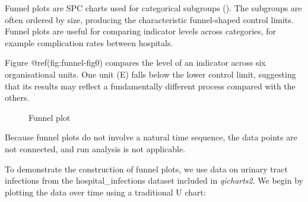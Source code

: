 \documentclass[
]{book}
\makeatletter
\newenvironment{Shaded}{\begin{snugshade}}{\end{snugshade}}
\newcommand{\AttributeTok}[1]{\textcolor[rgb]{0.13,0.29,0.53}{#1}}
\newcommand{\CommentTok}[1]{\textcolor[rgb]{0.56,0.35,0.01}{\textit{#1}}}
\newcommand{\DecValTok}[1]{\textcolor[rgb]{0.00,0.00,0.81}{#1}}
\newcommand{\FunctionTok}[1]{\textcolor[rgb]{0.13,0.29,0.53}{\textbf{#1}}}
\newcommand{\NormalTok}[1]{#1}
\newcommand{\OtherTok}[1]{\textcolor[rgb]{0.56,0.35,0.01}{#1}}
\newcommand{\SpecialCharTok}[1]{\textcolor[rgb]{0.81,0.36,0.00}{\textbf{#1}}}
\newcommand{\StringTok}[1]{\textcolor[rgb]{0.31,0.60,0.02}{#1}}
\newcommand*\pandocbounded[1]{%
  \sbox\pandoc@box{#1}%
  \Gscale@div\@tempa{\textheight}{\dimexpr\ht\pandoc@box+\dp\pandoc@box\relax}%
  \Gscale@div\@tempb{\linewidth}{\wd\pandoc@box}%
  \ifdim\@tempb\p@<\@tempa\p@\let\@tempa\@tempb\fi%
  \ifdim\@tempa\p@<\p@\scalebox{\@tempa}{\usebox\pandoc@box}%
  \else\usebox{\pandoc@box}%
  \fi%
}
\makeatother
\begin{document}
Funnel plots are SPC charts used for categorical subgroups
(). The subgroups
are often ordered by size, producing the characteristic funnel-shaped
control limits. Funnel plots are useful for comparing indicator levels
across categories, for example complication rates between hospitals.

Figure @ref(fig:funnel-fig0) compares the level of an indicator across
six organisational units. One unit (E) falls below the lower control
limit, suggesting that its results may reflect a fundamentally different
process compared with the others.

\begin{figure}
\centering
\pandocbounded{}
\caption{Funnel plot}
\end{figure}

Because funnel plots do not involve a natural time sequence, the data
points are not connected, and run analysis is not applicable.

To demonstrate the construction of funnel plots, we use data on urinary
tract infections from the hospital\_infections dataset included in
\emph{qicharts2}. We begin by plotting the data over time using a
traditional U chart:

\begin{Shaded}
\end{Shaded}
\end{document}
